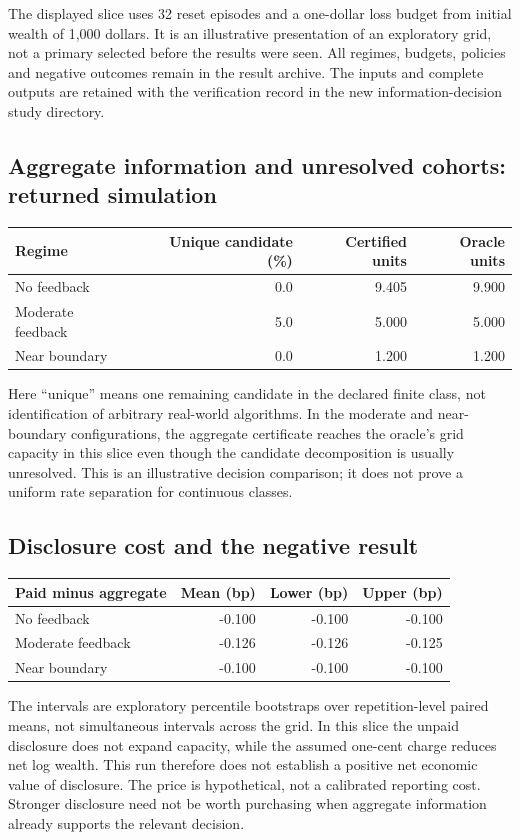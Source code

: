 \documentclass[12pt]{article}
\theoremstyle{definition}
\theoremstyle{remark}
\begin{document}
The displayed slice uses 32 reset episodes and a one-dollar loss budget from
initial wealth of 1,000 dollars. It is an illustrative presentation of an
exploratory grid, not a primary selected before the results were seen. All
regimes, budgets, policies and negative outcomes remain in the result archive.
The inputs and complete outputs are retained with the verification record in
the new information-decision study directory.

\subsection*{Aggregate information and unresolved cohorts: returned simulation}
\begin{center}\small
\begin{tabular}{lrrr}
\toprule
Regime & Unique candidate (\%) & Certified units & Oracle units\\
\midrule
No feedback & 0.0 & 9.405 & 9.900\\
Moderate feedback & 5.0 & 5.000 & 5.000\\
Near boundary & 0.0 & 1.200 & 1.200\\
\bottomrule
\end{tabular}
\end{center}
Here ``unique'' means one remaining candidate in the declared finite class,
not identification of arbitrary real-world algorithms. In the moderate and
near-boundary configurations, the aggregate certificate reaches the oracle's
grid capacity in this slice even though the candidate decomposition is usually
unresolved. This is an illustrative decision comparison; it does not prove a
uniform rate separation for continuous classes.

\subsection*{Disclosure cost and the negative result}
\begin{center}\small
\begin{tabular}{lrrr}
\toprule
Paid minus aggregate & Mean (bp) & Lower (bp) & Upper (bp)\\
\midrule
No feedback & -0.100 & -0.100 & -0.100\\
Moderate feedback & -0.126 & -0.126 & -0.125\\
Near boundary & -0.100 & -0.100 & -0.100\\
\bottomrule
\end{tabular}
\end{center}
The intervals are exploratory percentile bootstraps over repetition-level
paired means, not simultaneous intervals across the grid. In this slice the
unpaid disclosure does not expand capacity, while the assumed one-cent charge
reduces net log wealth. This run therefore does not establish a positive net
economic value of disclosure. The price is hypothetical, not a calibrated
reporting cost. Stronger disclosure need not be worth purchasing when aggregate
information already supports the relevant decision.
\end{document}
